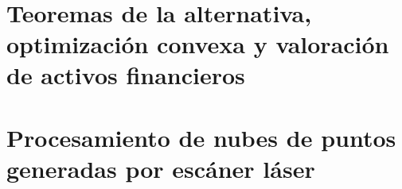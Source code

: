 \documentclass[a4paper,11pt]{book}
\begin{document}
	

\tableofcontents
%





\\

\part{Teoremas de la alternativa, optimización convexa y valoración de activos financieros}














\part{Procesamiento de nubes de puntos generadas por escáner láser}











\end{document}
